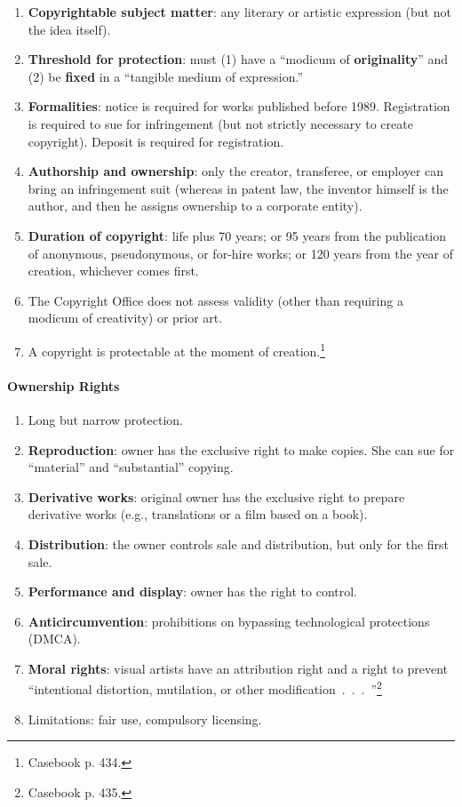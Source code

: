 \begin{enumerate}
    \item \textbf{Copyrightable subject matter}: any literary or artistic 
    expression (but not the idea itself).
    \item \textbf{Threshold for protection}: must (1) have a ``modicum of 
    \textbf{originality}'' and (2) be \textbf{fixed} in a ``tangible medium of 
    expression.''
    \item \textbf{Formalities}: notice is required for works published before 
    1989. Registration is required to sue for infringement (but not strictly 
    necessary to create copyright). Deposit is required for registration.
    \item \textbf{Authorship and ownership}: only the creator, transferee, or 
    employer can bring an infringement suit (whereas in patent law, the 
    inventor himself is the author, and then he assigns ownership to a 
    corporate entity).
    \item \textbf{Duration of copyright}: life plus 70 years; or 95 years from 
    the publication of anonymous, pseudonymous, or for-hire works; or 120 
    years from the year of creation, whichever comes first.
    \item The Copyright Office does not assess validity (other than requiring 
    a modicum of creativity) or prior art.
    \item A copyright is protectable at the moment of 
    creation.\footnote{Casebook p. 434.}
\end{enumerate}

\paragraph{Ownership Rights}

\begin{enumerate}
    \item Long but narrow protection.
    \item \textbf{Reproduction}: owner has the exclusive right to make copies. 
    She can sue for ``material'' and ``substantial'' copying.
    \item \textbf{Derivative works}: original owner has the exclusive right to 
    prepare derivative works (e.g., translations or a film based on a book).
    \item \textbf{Distribution}: the owner controls sale and distribution, but 
    only for the first sale.
    \item \textbf{Performance and display}: owner has the right to control.
    \item \textbf{Anticircumvention}: prohibitions on bypassing technological 
    protections (DMCA).
    \item \textbf{Moral rights}: visual artists have an attribution right and 
    a right to prevent ``intentional distortion, mutilation, or other 
    modification~.~.~.~''\footnote{Casebook p. 435.}
    \item Limitations: fair use, compulsory licensing.
\end{enumerate}

